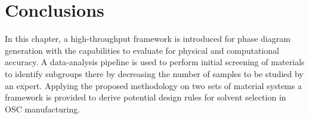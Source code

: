 \section{Conclusions}
In this chapter, a high-throughput framework is introduced for phase diagram generation with the capabilities to evaluate for physical and computational accuracy. 
A data-analysis pipeline is used to perform initial screening of materials to identify subgroups there by decreasing the number of samples to be studied by an expert.
Applying the proposed methodology on two sets of material systems a framework is provided to derive potential design rules for solvent selection in OSC manufacturing.

